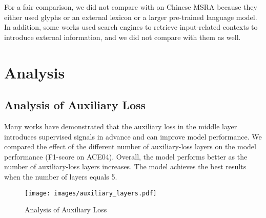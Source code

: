 \documentclass[11pt]{article}
\begin{document}
For a fair comparison, we did not compare with \citet{Sun_Wang_Li_Feng_Tian_Wu_Wang_2020, li-etal-2020-flat, NEURIPS2019_452bf208} on Chinese MSRA because they either used glyphs or an external lexicon or a larger pre-trained language model. In addition, some works \citep{wang-etal-2021-improving, wang2022damonlp} used search engines to retrieve input-related contexts to introduce external information, and we did not compare with them as well.









































\section{Analysis}
\label{app:analysis}


\subsection{Analysis of Auxiliary Loss}
\label{aux}
Many works \citep{article,10.1007/978-3-030-58452-8_13} have demonstrated that the auxiliary loss in the middle layer introduces supervised signals in advance and can improve model performance.
We compared the effect of the different number of auxiliary-loss layers on the model performance (F1-score on ACE04). Overall, the model performs better as the number of auxiliary-loss layers increases. The model achieves the best results when the number of layers equals 5.

\begin{figure}[h]
  \centering
  \texttt{[image: images/auxiliary\_layers.pdf]}
  \caption{Analysis of Auxiliary Loss}
  \label{fig:auxiliary_layers}
\end{figure}
\end{document}
